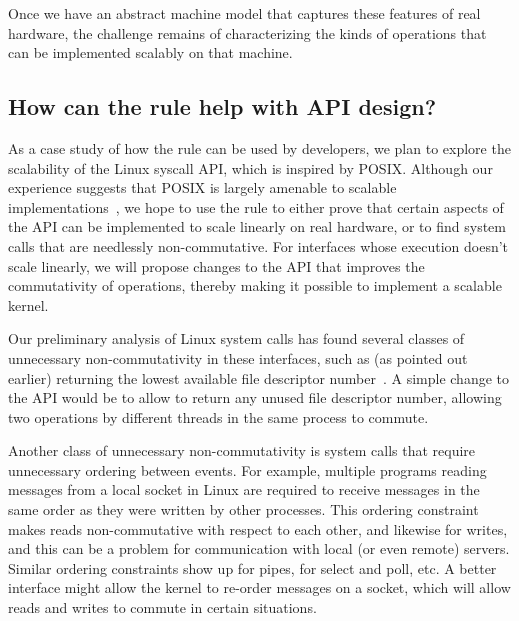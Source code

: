 Once we have an abstract machine model that captures these features of
real hardware, the challenge remains of characterizing the kinds of
operations that can be implemented scalably on that machine.


\subsection{How can the rule help with API design?}
\label{sec:api}

As a case study of how the rule can be used by developers, we plan to
explore the scalability of the Linux syscall API, which is inspired
by POSIX\@.  Although our experience suggests that POSIX is largely
amenable to scalable implementations~\cite{boyd-wickizer:scaling}, we hope
to use the rule to either prove that certain aspects of the API can be
implemented to scale linearly on real hardware, or to find system calls
that are needlessly non-commutative.  For interfaces whose execution
doesn't scale linearly, we will propose changes to the API that improves
the commutativity of operations, thereby making it possible to implement
a scalable kernel.

Our preliminary analysis of Linux system calls has found several
classes of unnecessary non-commutativity in these interfaces, such as
(as pointed out earlier)  returning the lowest available
file descriptor number~\cite{boyd-wickizer:corey}.
%
A simple change to the API would be to allow  to return any
unused file descriptor number, allowing two  operations by
different threads in the same process to commute.

Another class of unnecessary non-commutativity is system calls that
require unnecessary ordering between events.  For example, multiple
programs reading messages from a local socket in Linux are required
to receive messages in the same order as they were written by other
processes.  This ordering constraint makes reads non-commutative with
respect to each other, and likewise for writes, and this can be a problem
for communication with local (or even remote) servers.  Similar ordering
constraints show up for pipes, for select and poll, etc.  A better
interface might allow the kernel to re-order messages on a socket,
which will allow reads and writes to commute in certain situations.

